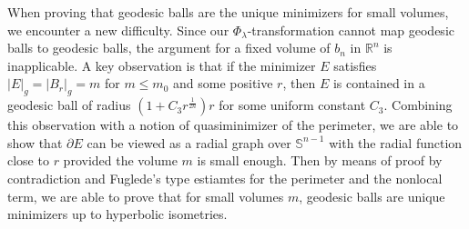 \documentclass[11pt,reqno]{amsart}
\theoremstyle{definition}
\theoremstyle{remark}
\numberwithin{equation}{section}
\renewcommand{\(}{\left(}
\renewcommand{\)}{\right)}
\renewcommand{\-}{\overline}
\begin{document}
When proving that geodesic balls are the unique minimizers for small volumes, we encounter a new difficulty. Since our $\Phi_{\lambda}$-transformation cannot map geodesic balls to geodesic balls, the argument for a fixed volume of $b_n$ in $\mathbb{R}^n$ is inapplicable. A key observation is that if the minimizer $E$ satisfies $|E|_g=|B_r|_g=m$ for $m\leq m_0$ and some positive $r$, then $E$ is contained in a geodesic ball of radius $(1+C_3 r^{\frac{1}{2n}})r$ for some uniform constant $C_3$. Combining this observation with a notion of quasiminimizer of the perimeter, we are able to show that $\partial E$ can be viewed as a radial graph over $\mathbb{S}^{n-1}$ with the radial function close to $r$ provided the volume $m$ is small enough. Then by means of proof by contradiction and Fuglede's type estiamtes for the perimeter and the nonlocal term, we are able to prove that for small volumes $m$, geodesic balls are unique minimizers up to hyperbolic isometries.
		
\end{document}
